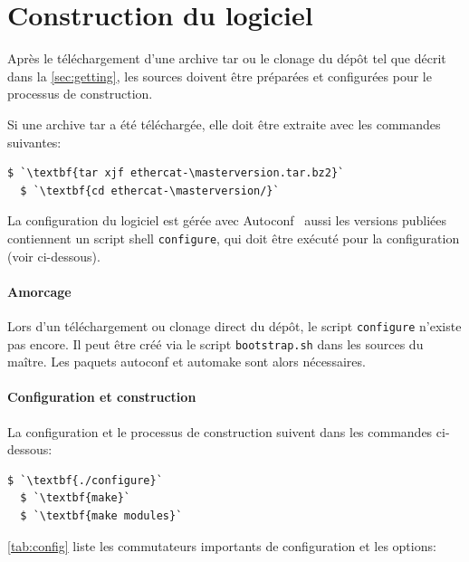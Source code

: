 \documentclass[a4paper,12pt,BCOR=6mm,bibtotoc,idxtotoc]{scrbook}
\newcommand{\masterversion}{1.5.2}
\begin{document}
\section{Construction du logiciel}

Apr\`es le t\'el\'echargement d'une archive tar ou le clonage du
d\'ep\^ot tel que d\'ecrit dans la \autoref{sec:getting}, les sources
doivent \^etre pr\'epar\'ees et configur\'ees pour le processus de
construction.

Si une archive tar a \'et\'e t\'el\'echarg\'ee, elle doit \^etre
extraite avec les commandes suivantes:

\begin{lstlisting}[gobble=2]
  $ `\textbf{tar xjf ethercat-\masterversion.tar.bz2}`
  $ `\textbf{cd ethercat-\masterversion/}`
\end{lstlisting}

La configuration du logiciel est g\'er\'ee avec
Autoconf~\cite{autoconf} aussi les versions publi\'ees contiennent un
script shell \lstinline+configure+, qui doit \^etre
ex\'ecut\'e pour la configuration (voir ci-dessous).

 \paragraph{Amorcage} Lors d'un t\'el\'echargement ou clonage
 direct du d\'ep\^ot, le script \lstinline+configure+ n'existe pas
 encore.  Il peut \^etre cr\'e\'e via le script
 \lstinline+bootstrap.sh+ dans les sources du ma\^itre. Les paquets
 autoconf et automake sont alors n\'ecessaires.

 \paragraph{Configuration et construction} La configuration
 et le processus de construction suivent dans les commandes
 ci-dessous:

\begin{lstlisting}[gobble=2]
  $ `\textbf{./configure}`
  $ `\textbf{make}`
  $ `\textbf{make modules}`
\end{lstlisting}

\autoref{tab:config} liste les commutateurs importants de
configuration et les options:
\end{document}
